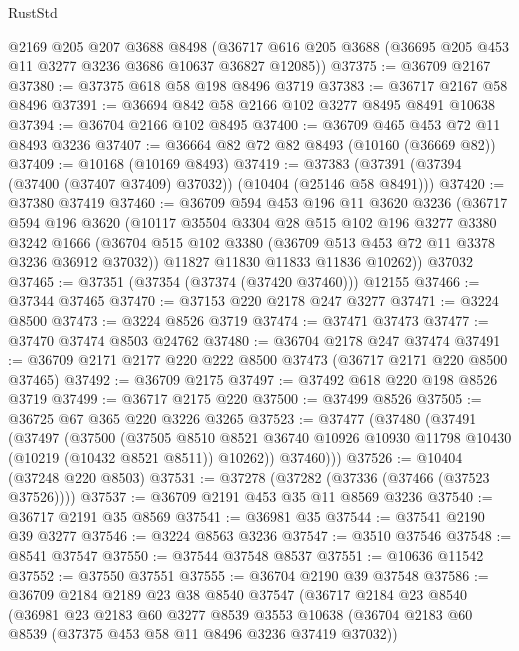 \begin{lexlean}{RustStd}
\begin{coremodule}
    @2169
    @205
    @207
    @3688
    @8498
    (@36717 @616 @205 @3688 (@36695 @205 @453 @11 @3277 @3236 @3686 @10637 @36827 @12085))
@37375 := @36709 @2167
@37380 := @37375 @618 @58 @198 @8496 @3719
@37383 := @36717 @2167 @58 @8496
@37391 := @36694 @842 @58 @2166 @102 @3277 @8495 @8491 @10638
@37394 := @36704 @2166 @102 @8495
@37400 := @36709 @465 @453 @72 @11 @8493 @3236
@37407 := @36664 @82 @72 @82 @8493 (@10160 (@36669 @82))
@37409 := @10168 (@10169 @8493)
@37419 := @37383 (@37391 (@37394 (@37400 (@37407 @37409) @37032)) (@10404 (@25146 @58 @8491)))
@37420 := @37380 @37419
@37460 := @36709
    @594
    @453
    @196
    @11
    @3620
    @3236
    (@36717
      @594
      @196
      @3620
      (@10117
        @35504
        @3304
        @28
        @515
        @102
        @196
        @3277
        @3380
        @3242
        @1666
        (@36704 @515 @102 @3380 (@36709 @513 @453 @72 @11 @3378 @3236 @36912 @37032))
        @11827
        @11830
        @11833
        @11836
        @10262))
    @37032
@37465 := @37351 (@37354 (@37374 (@37420 @37460))) @12155
@37466 := @37344 @37465
@37470 := @37153 @220 @2178 @247 @3277
@37471 := @3224 @8500
@37473 := @3224 @8526 @3719
@37474 := @37471 @37473
@37477 := @37470 @37474 @8503 @24762
@37480 := @36704 @2178 @247 @37474
@37491 := @36709 @2171 @2177 @220 @222 @8500 @37473 (@36717 @2171 @220 @8500 @37465)
@37492 := @36709 @2175
@37497 := @37492 @618 @220 @198 @8526 @3719
@37499 := @36717 @2175 @220
@37500 := @37499 @8526
@37505 := @36725 @67 @365 @220 @3226 @3265
@37523 := @37477
    (@37480
      (@37491
        (@37497
          (@37500
            (@37505
              @8510
              @8521
              @36740
              @10926
              @10930
              @11798
              @10430
              (@10219 (@10432 @8521 @8511))
              @10262))
          @37460)))
@37526 := @10404 (@37248 @220 @8503)
@37531 := @37278 (@37282 (@37336 (@37466 (@37523 @37526))))
@37537 := @36709 @2191 @453 @35 @11 @8569 @3236
@37540 := @36717 @2191 @35 @8569
@37541 := @36981 @35
@37544 := @37541 @2190 @39 @3277
@37546 := @3224 @8563 @3236
@37547 := @3510 @37546
@37548 := @8541 @37547
@37550 := @37544 @37548 @8537
@37551 := @10636 @11542
@37552 := @37550 @37551
@37555 := @36704 @2190 @39 @37548
@37586 := @36709
    @2184
    @2189
    @23
    @38
    @8540
    @37547
    (@36717
      @2184
      @23
      @8540
      (@36981
        @23
        @2183
        @60
        @3277
        @8539
        @3553
        @10638
        (@36704 @2183 @60 @8539 (@37375 @453 @58 @11 @8496 @3236 @37419 @37032))

\end{coremodule}
\end{lexlean}
